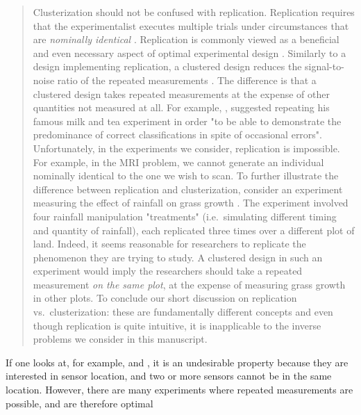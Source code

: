 \begin{quote} %
  Clusterization should not be confused with replication. Replication
  requires that the experimentalist executes multiple trials under
  circumstances that are \emph{nominally identical} \cite[Section
    1.2.4]{morris2011}. Replication is commonly viewed as a beneficial
  and even necessary aspect of optimal experimental design
  \cite{fisher1949design, morris2011,
    schafer2001replication}. Similarly to a design implementing
  replication, a clustered design reduces the signal-to-noise ratio of
  the repeated measurements \cite{telford2007brief}. The difference is
  that a clustered design takes repeated measurements at the expense
  of other quantities not measured at all.
  \newline
For example, \cite{fisher1949design}, suggested repeating his famous
milk and tea experiment in order "to be able to demonstrate the
predominance of correct classifications in spite of occasional
errors". Unfortunately, in the experiments we consider, replication is
impossible. For example, in the MRI problem, we cannot generate an
individual nominally identical to the one we wish to scan.
\newline
To further illustrate the difference between replication and
clusterization, consider an experiment measuring the effect of
rainfall on grass growth \cite{fay2000rainfall}. The experiment
involved four rainfall manipulation "treatments" (i.e.~simulating
different timing and quantity of rainfall), each replicated three
times over a different plot of land. Indeed, it seems reasonable for
researchers to replicate the phenomenon they are trying to study. A
clustered design in such an experiment would imply the researchers
should take a repeated measurement \emph{on the same plot}, at the
expense of measuring grass growth in other plots. To conclude our
short discussion on replication vs.~clusterization: these are
fundamentally different concepts and even though replication is quite
intuitive, it is inapplicable to the inverse problems we consider in
this manuscript.
\end{quote}



\RC If one looks at, for example, \cite{fedorov1996} and
\cite{nyberg2012}, it is an undesirable property because they are
interested in sensor location, and two or more sensors cannot be in
the same location. However, there are many experiments where repeated
measurements are possible, and are therefore optimal

